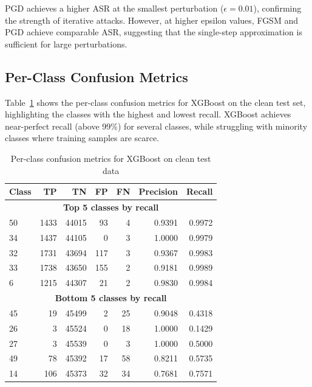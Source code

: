 \documentclass[12pt,a4paper,oneside]{report}
\begin{document}
PGD achieves a higher ASR at the smallest perturbation ($\epsilon = 0.01$), confirming the strength of iterative attacks. However, at higher epsilon values, FGSM and PGD achieve comparable ASR, suggesting that the single-step approximation is sufficient for large perturbations.

\subsection{Per-Class Confusion Metrics}

Table~\ref{tab:confusion_summary} shows the per-class confusion metrics for XGBoost on the clean test set, highlighting the classes with the highest and lowest recall. XGBoost achieves near-perfect recall (above 99\%) for several classes, while struggling with minority classes where training samples are scarce.

\begin{table}[H]
    \centering
    \caption[XGBoost per-class confusion summary]{Per-class confusion metrics for XGBoost on clean test data}\label{tab:confusion_summary}
    \begin{tabular}{lrrrrrr}
        \toprule
        Class & TP & TN & FP & FN & Precision & Recall \\
        \midrule
        \multicolumn{7}{c}{\textbf{Top 5 classes by recall}} \\
        50 & 1433 & 44015 & 93 & 4 & 0.9391 & 0.9972 \\
        34 & 1437 & 44105 & 0 & 3 & 1.0000 & 0.9979 \\
        32 & 1731 & 43694 & 117 & 3 & 0.9367 & 0.9983 \\
        33 & 1738 & 43650 & 155 & 2 & 0.9181 & 0.9989 \\
        6  & 1215 & 44307 & 21 & 2 & 0.9830 & 0.9984 \\
        \midrule
        \multicolumn{7}{c}{\textbf{Bottom 5 classes by recall}} \\
        45 & 19 & 45499 & 2 & 25 & 0.9048 & 0.4318 \\
        26 & 3  & 45524 & 0 & 18 & 1.0000 & 0.1429 \\
        27 & 3  & 45539 & 0 & 3 & 1.0000 & 0.5000 \\
        49 & 78 & 45392 & 17 & 58 & 0.8211 & 0.5735 \\
        14 & 106 & 45373 & 32 & 34 & 0.7681 & 0.7571 \\
        \bottomrule
    \end{tabular}
\end{table}
\end{document}
